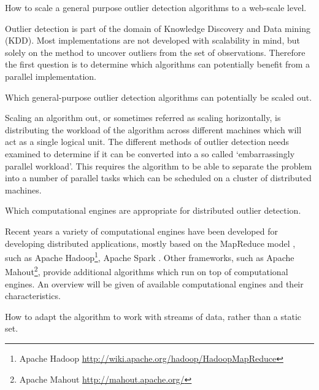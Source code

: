 \begin{research-question} 
How to scale a general purpose outlier detection algorithms to a web-scale level. \label{req1}
\end{research-question}   

Outlier detection is part of the domain of Knowledge Discovery and Data mining (KDD). Most implementations are not developed with scalability in mind, but solely on the method to uncover outliers from the set of observations. Therefore the first question is to determine which algorithms can potentially benefit from a parallel implementation.

\begin{research-sub-question} 
Which general-purpose outlier detection algorithms can potentially be scaled out. \label{sub-req1}
\end{research-sub-question}

Scaling an algorithm out, or sometimes referred as scaling horizontally, is distributing the workload of the algorithm across different machines which will act as a single logical unit. The different methods of outlier detection needs examined to determine if it can be converted into a so called `embarrassingly parallel workload'. This requires the algorithm to be able to separate the problem into a number of parallel tasks which can be scheduled on a cluster of distributed machines.

\begin{research-sub-question} 
Which computational engines are appropriate for distributed outlier detection. \label{sub-req2}
\end{research-sub-question}

Recent years a variety of computational engines have been developed for developing distributed applications, mostly based on the MapReduce model \cite{Dean:2008:MSD:1327452.1327492}, such as Apache Hadoop\footnote{Apache Hadoop \url{http://wiki.apache.org/hadoop/HadoopMapReduce}}, Apache Spark \cite{Zaharia:2010:SCC:1863103.1863113}. Other frameworks, such as Apache Mahout\footnote{Apache Mahout \url{http://mahout.apache.org/}}, provide additional algorithms which run on top of computational engines. An overview will be given of available computational engines and their characteristics.


\begin{research-sub-question} 
How to adapt the algorithm to work with streams of data, rather than a static set. \label{sub-req3}
\end{research-sub-question}

